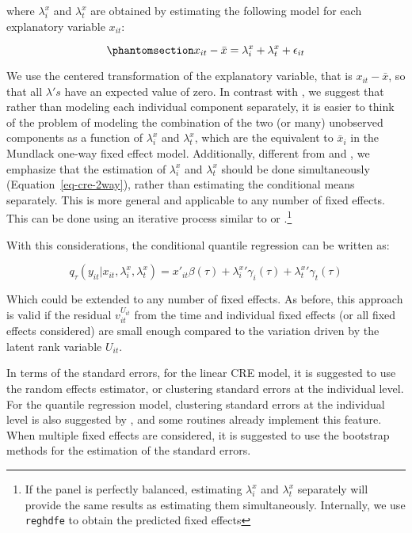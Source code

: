 \documentclass[bib]{statapress}
\begin{document}
where \(\lambda_i^x\) and \(\lambda_t^x\) are obtained by estimating the
following model for each explanatory variable \(x_{it}\):

\begin{equation}\phantomsection\label{eq-cre-2way}{x_{it} -\bar x = \lambda_i^x + \lambda_t^x + \epsilon_{it}
}\end{equation}

We use the centered transformation of the explanatory variable, that is
\(x_{it}-\bar x\), so that all \(\lambda's\) have an expected value of
zero. In contrast with \citet{baltagi2023}, we suggest that rather than
modeling each individual component separately, it is easier to think of
the problem of modeling the combination of the two (or many) unobserved
components as a function of \(\lambda_i^x\) and \(\lambda_t^x\), which
are the equivalent to \(\bar x_i\) in the Mundlack one-way fixed effect
model. Additionally, different from \citet{wooldridge2021} and
\citet{baltagi2023}, we emphasize that the estimation of \(\lambda_i^x\)
and \(\lambda_t^x\) should be done simultaneously
(Equation~\ref{eq-cre-2way}), rather than estimating the conditional
means separately. This is more general and applicable to any number of
fixed effects. This can be done using an iterative process similar to
\citet{rios2015} or \citet{correia_feasible_nodate}.\footnote{If the
  panel is perfectly balanced, estimating \(\lambda_i^x\) and
  \(\lambda_t^x\) separately will provide the same results as estimating
  them simultaneously. Internally, we use
  \citet{correia_feasible_nodate} \texttt{reghdfe} to obtain the
  predicted fixed effects}

With this considerations, the conditional quantile regression can be
written as:

\[q_\tau(y_{it}|x_{it},\lambda_i^x,\lambda_t^x)=x'_{it}\beta(\tau)+{\lambda^x_i}'\gamma_i(\tau)
+{\lambda^x_t}'\gamma_t(\tau)  
\]

Which could be extended to any number of fixed effects. As before, this
approach is valid if the residual \(v^{U_{it}}_{it}\) from the time and
individual fixed effects (or all fixed effects considered) are small
enough compared to the variation driven by the latent rank variable
\(U_{it}\).

In terms of the standard errors, for the linear CRE model, it is
suggested to use the random effects estimator, or clustering standard
errors at the individual level. For the quantile regression model,
clustering standard errors at the individual level is also suggested by
\citet{wooldridge2010}, and some routines already implement this
feature. When multiple fixed effects are considered, it is suggested to
use the bootstrap methods for the estimation of the standard errors.
\end{document}
